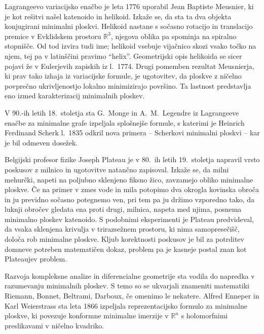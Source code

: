 \documentclass[12pt,a4paper,twoside]{article}
\theoremstyle{definition} %
\theoremstyle{plain} %
\numberwithin{equation}{section}  %
\newcommand{\R}{\mathbb R}
\begin{document}
Lagrangeevo variacijsko enačbo je leta 1776 uporabil Jean Baptiste Meusnier, ki je kot rešitvi našel katenoido in helikoid. Izkaže se, da sta ta dva objekta konjugirani minimalni ploskvi. Helikoid nastane s sočasno rotacijo in translacijo premice v Evklidskem prostoru $\R^3$, njegova oblika pa spominja na spiralno stopnišče. Od tod izvira tudi ime; helikoid vsebuje vijačnico skozi vsako točko na njem, tej pa v latinščini pravimo ``helix''. Geometrijski opis helikoida se sicer pojavi že v Eulerjevih zapiskih iz l.~1774. 
Drugi pomemben rezultat Meusnierja, ki prav tako izhaja iz variacijske formule, je ugotovitev, da ploskve z ničelno povprečno ukrivljenostjo lokalno minimizirajo površino. Ta lastnost predstavlja eno izmed karakterizacij minimalnih ploskev.

V 90.-ih letih 18.~stoletja sta G.~Monge in A.~M.~Legendre iz Lagrangeeve enačbe za minimalne grafe izpeljala splošnejše formule, s katerimi je Heinrich Ferdinand Scherk l.~1835 odkril nova primera -- Scherkovi minimalni ploskvi -- kar je bil odmeven dosežek. 

Belgijski profesor fizike Joseph Plateau je v 80.~ih letih 19.~stoletja napravil vrsto poskusov z milnico in ugotovitve natančno zapisoval. Izkaže se, da milni mehurčki, napeti na poljubno sklenjeno fiksno žico, zavzamejo obliko minimalne ploskve. Če na primer v zmes vode in mila potopimo dva okrogla kovinska obroča in ju previdno sočasno potegnemo ven, pri tem pa ju držimo vzporedno tako, da luknji obročev gledata ena proti drugi, milnica, napeta med njima, posnema minimalno ploskev katenoido. S podobnimi eksperimenti je Plateau predvideval, da vsaka sklenjena krivulja v trirazsežnem prostoru, ki nima samopresečišč, določa rob minimalne ploskve. Kljub korektnosti poskusov je bil za potrditev domneve potreben matematičen dokaz, problem pa je kasneje postal znan kot Plateaujev problem.

Razvoja kompleksne analize in diferencialne geometrije sta vodila do napredka v razumevanju minimalnih ploskev. S temo so se ukvarjali znameniti matematiki Riemann, Bonnet, Beltrami, Darboux, če omenimo le nekatere. Alfred Enneper in Karl Weierstrass sta leta 1866 izpeljala reprezentacijsko formulo za minimalne ploskve, ki povezuje konformne minimalne imerzije v $\R^{n}$ s holomorfnimi preslikavami v ničelno kvadriko. 
\end{document}
